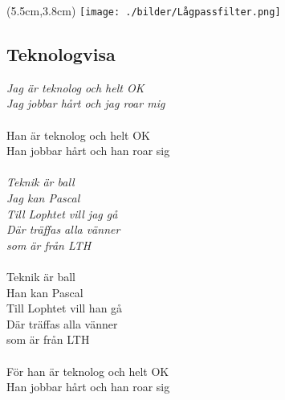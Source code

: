 \newpage
\noBackground

\begin{textblock*}{2.7cm}(5.5cm,3.8cm) %
    \texttt{[image: ./bilder/Lågpassfilter.png]}
\end{textblock*}

\subsection*{Teknologvisa} 

\noindent\textit{Jag är teknolog och helt OK\\
Jag jobbar hårt och jag roar mig}\\\\
\noindent Han är teknolog och helt OK\\
Han jobbar hårt och han roar sig\\\\
\noindent\textit{Teknik är ball\\
Jag kan Pascal\\
Till Lophtet vill jag gå\\
Där träffas alla vänner\\
som är från LTH}\\\\
\noindent Teknik är ball\\
Han kan Pascal\\
Till Lophtet vill han gå\\
Där träffas alla vänner\\
som är från LTH\\\\
\noindent För han är teknolog och helt OK\\
Han jobbar hårt och han roar sig\\\\


\newpage
\resetBackground

